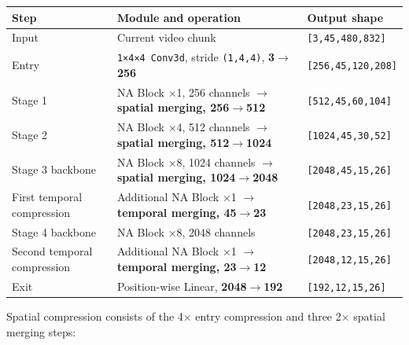 \documentclass[
  11pt,
  a4paper,
]{article}
\newcounter{none} %
\begin{document}
{\def\LTcaptype{none} %
\begin{longtable}[]{@{}
  >{\raggedright\arraybackslash}p{}
  >{\raggedright\arraybackslash}p{}
  >{\raggedright\arraybackslash}p{}@{}}
\toprule\noalign{}
\begin{minipage}[b]{\linewidth}\raggedright
Step
\end{minipage} & \begin{minipage}[b]{\linewidth}\raggedright
Module and operation
\end{minipage} & \begin{minipage}[b]{\linewidth}\raggedright
Output shape
\end{minipage} \\
\midrule\noalign{}
\endhead
\bottomrule\noalign{}
\endlastfoot
Input & Current video chunk & \texttt{{[}3,45,480,832{]}} \\
Entry & \texttt{1×4×4\ Conv3d}, stride \texttt{(1,4,4)},
\textbf{3\(\rightarrow\)256} & \texttt{{[}256,45,120,208{]}} \\
Stage 1 & NA Block ×1, 256 channels \(\rightarrow\) \textbf{spatial
merging, 256\(\rightarrow\)512} & \texttt{{[}512,45,60,104{]}} \\
Stage 2 & NA Block ×4, 512 channels \(\rightarrow\) \textbf{spatial
merging, 512\(\rightarrow\)1024} & \texttt{{[}1024,45,30,52{]}} \\
Stage 3 backbone & NA Block ×8, 1024 channels \(\rightarrow\)
\textbf{spatial merging, 1024\(\rightarrow\)2048} &
\texttt{{[}2048,45,15,26{]}} \\
First temporal compression & Additional NA Block ×1 \(\rightarrow\)
\textbf{temporal merging, 45\(\rightarrow\)23} &
\texttt{{[}2048,23,15,26{]}} \\
Stage 4 backbone & NA Block ×8, 2048 channels &
\texttt{{[}2048,23,15,26{]}} \\
Second temporal compression & Additional NA Block ×1 \(\rightarrow\)
\textbf{temporal merging, 23\(\rightarrow\)12} &
\texttt{{[}2048,12,15,26{]}} \\
Exit & Position-wise Linear, \textbf{2048\(\rightarrow\)192} &
\texttt{{[}192,12,15,26{]}} \\
\end{longtable}
}

\endgroup

Spatial compression consists of the 4× entry compression and three 2×
spatial merging steps:
\end{document}
